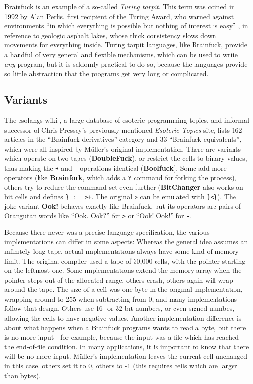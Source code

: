 Brainfuck is an example of a so-called \emph{Turing tarpit}. This term was coined in 1992 by Alan Perlis, first recipient of the Turing Award, who warned against environments “in which everything is possible but nothing of interest is easy” \cite{perlis1982epigrams}, in reference to geologic asphalt lakes, whose thick consistency slows down movements for everything inside. Turing tarpit languages, like Brainfuck, provide a handful of very general and flexible mechanisms, which can be used to write \emph{any} program, but it is seldomly practical to do so, because the languages provide so little abstraction that the programs get very long or complicated.


\subsection{Variants}
\label{sec:brainfuck_variants}

The esolangs wiki \cite{esolang}, a large database of esoteric programming topics, and informal successor of Chris Pressey's previously mentioned \emph{Esoteric Topics} site, lists 162 articles in the “Brainfuck derivatives” category and 33 “Brainfuck equivalents”, which were all inspired by Müller's original implementation. There are variants which operate on two tapes (\textbf{DoubleFuck}), or restrict the cells to binary values, thus making the \texttt{+} and \texttt{-} operations identical (\textbf{Boolfuck}). Some add more operators (like \textbf{Brainfork}, which adds a \texttt{Y} command for forking the process), others try to reduce the command set even further (\textbf{BitChanger} also works on bit cells and defines \texttt{\}} $:=$ \texttt{>+}. The original \texttt{>} can be emulated with \texttt{\}<\}}).
The joke variant \textbf{Ook!} behaves exactly like Brainfuck, but its operators are pairs of Orangutan words like “Ook. Ook?” for \texttt{>} or “Ook! Ook!” for \texttt{-}.

Because there never was a precise language specification, the various implementations can differ in some aspects:
Whereas the general idea assumes an infinitely long tape, actual implementations always have some kind of memory limit. The original compiler used a tape of 30,000 cells, with the pointer starting on the leftmost one. Some implementations extend the memory array when the pointer steps out of the allocated range, others crash, others again will wrap around the tape.
The size of a cell was one byte in the original implementation, wrapping around to 255 when subtracting from 0, and many implementations follow that design. Others use 16- or 32-bit numbers, or even signed numbes, allowing the cells to have negative values.
Another implementation difference is about what happens when a Brainfuck programs wants to read a byte, but there is no more input---for example, because the input was a file which has reached the end-of-file condition. In many applications, it is important to know that there will be no more input. Müller's implementation leaves the current cell unchanged in this case, others set it to 0, others to -1 (this requires cells which are larger than bytes).

